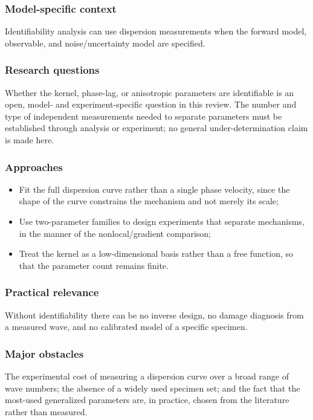 \subsubsection{Model-specific context}

Identifiability analysis can use dispersion measurements when the forward model, observable, and noise/uncertainty model are specified.

\subsubsection{Research questions}

Whether the kernel, phase-lag, or anisotropic parameters are identifiable is an open, model- and experiment-specific question in this review. The number and type of independent measurements needed to separate parameters must be established through analysis or experiment; no general under-determination claim is made here.

\subsubsection{Approaches}

\begin{itemize}
\item Fit the full dispersion curve rather than a single phase velocity, since the shape of the curve constrains the mechanism and not merely its scale;
\item Use two-parameter families to design experiments that separate mechanisms, in the manner of the nonlocal/gradient comparison;
\item Treat the kernel as a low-dimensional basis rather than a free function, so that the parameter count remains finite.
\end{itemize}

\subsubsection{Practical relevance}

Without identifiability there can be no inverse design, no damage diagnosis from a measured wave, and no calibrated model of a specific specimen.

\subsubsection{Major obstacles}

The experimental cost of measuring a dispersion curve over a broad range of wave numbers; the absence of a widely used specimen set; and the fact that the most-used generalized parameters are, in practice, chosen from the literature rather than measured.


